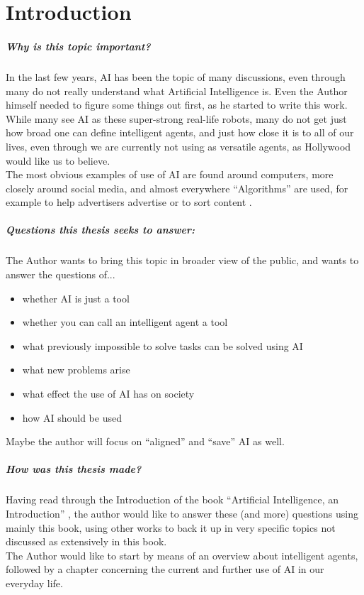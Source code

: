 \chapter{Introduction}
\paragraph{Why is this topic important?}
In the last few years, AI has been the topic of many discussions, even through many do not really understand what Artificial Intelligence is.
Even the Author himself needed to figure some things out first, as he started to write this work.\\
While many see AI as these super-strong real-life robots, many do not get just how broad one can define intelligent agents, and just how close it is to all of our lives, even through we are currently not using as versatile agents, as Hollywood would like us to believe.\\
The most obvious examples of use of AI are found around computers, more closely around social media, and almost everywhere “Algorithms” are used, for example to help advertisers advertise \cite{facebookWerbungAufInstagram} or to sort content \cite{googleFunktioniertGoogleSucheSuchalgorithmen}.
\paragraph{Questions this thesis seeks to answer:}
The Author wants to bring this topic in broader view of the public, and wants to answer the questions of... 
\begin{itemize}
    \item whether AI is just a tool
    \item whether you can call an intelligent agent a tool
    \item what previously impossible to solve tasks can be solved using AI
    \item what new problems arise
    \item what effect the use of AI has on society
    \item how AI should be used
\end{itemize}
Maybe the author will focus on “aligned” and “save” AI as well.
\paragraph{How was this thesis made?}
Having read through the Introduction of the book “Artificial Intelligence, an Introduction” \cite{russellArtificialIntelligenceModern2010}, the author would like to answer these (and more) questions using mainly this book, using other works to back it up in very specific topics not discussed as extensively in this book.\\
The Author would like to start by means of an overview about intelligent agents, followed by a chapter concerning the current and further use of AI in our everyday life.